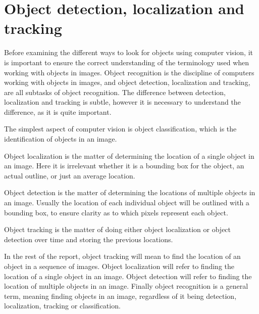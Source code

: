 \section{Object detection, localization and tracking}\label{sec:anal:objdet}
Before examining the different ways to look for objects using computer vision, it is important to ensure the correct understanding of the terminology used when working with objects in images.
Object recognition is the discipline of computers working with objects in images, and object detection, localization and tracking, are all subtasks of object recognition.
The difference between detection, localization and tracking is subtle, however it is necessary to understand the difference, as it is quite important\cite{objecttrackdetect}.

The simplest aspect of computer vision is object classification, which is the identification of objects in an image.

Object localization is the matter of determining the location of a single object in an image. 
Here it is irrelevant whether it is a bounding box for the object, an actual outline, or just an average location.

Object detection is the matter of determining the locations of multiple objects in an image.
Usually the location of each individual object will be outlined with a bounding box, to ensure clarity as to which pixels represent each object.

Object tracking is the matter of doing either object localization or object detection over time and storing the previous locations.

In the rest of the report, object tracking will mean to find the location of an object in a sequence of images.
Object localization will refer to finding the location of a single object in an image.
Object detection will refer to finding the location of multiple objects in an image.
Finally object recognition is a general term, meaning finding objects in an image, regardless of it being detection, localization, tracking or classification. 
